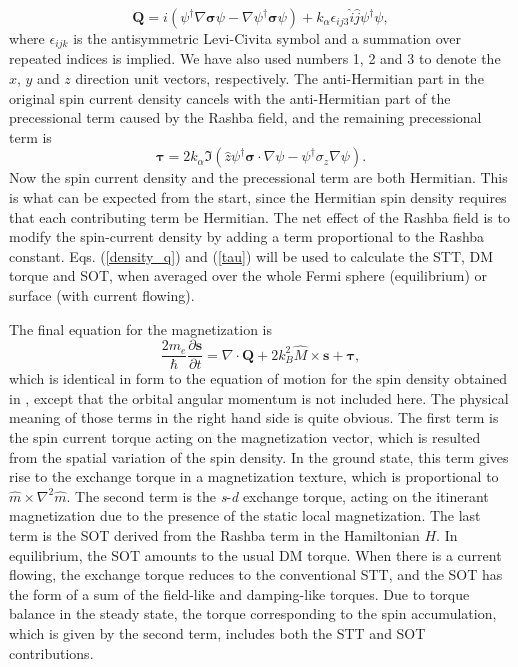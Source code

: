 \documentclass[12pt]{iopart}
\begin{document}
\begin{equation}
\textbf{Q} = i (\psi ^ \dagger \nabla \bm{\sigma} \psi - \nabla \psi ^ \dagger \bm{\sigma} \psi) + k_\alpha \epsilon _{ij3} \hat {i} \hat {j} \psi ^ \dagger \psi,
\label{density_q}
\end{equation}
where $\epsilon _{ijk}$ is the antisymmetric Levi-Civita symbol and a summation over repeated indices is implied. We have also used numbers 1, 2 and 3 to denote the $x$, $y$ and $z$ direction unit vectors, respectively. The anti-Hermitian part in the original spin current density cancels with the anti-Hermitian part of the precessional term caused by the Rashba field, and the remaining precessional term is
\begin{equation}
\bm {\tau} = 2k_\alpha \Im(\hat {z} \psi ^\dagger \bm {\sigma} \cdot \nabla \psi - \psi ^\dagger \sigma_z \nabla \psi).
\label{tau}
\end{equation}
Now the spin current density and the precessional term are both Hermitian. This is what can be expected from the start, since the Hermitian spin density requires that each contributing term be Hermitian. The net effect of the Rashba field is to modify the spin-current density by adding a term proportional to the Rashba constant. Eqs. (\ref{density_q}) and (\ref{tau}) will be used to calculate the STT, DM torque and SOT, when averaged over the whole Fermi sphere (equilibrium) or surface (with current flowing).

The final equation for the magnetization is
\begin{equation}
\frac{2 m_e} {\hbar} \frac {\partial \textbf {s}} {\partial t} = \nabla \cdot \textbf {Q} +  2k_B^2 \hat {M} \times \textbf {s} + \bm {\tau},
\end{equation}
which is identical in form to the equation of motion for the spin density obtained in \cite{Haney10}, except that the orbital angular momentum is not included here. The physical meaning of those terms in the right hand side is quite obvious. The first term is the spin current torque acting on the magnetization vector, which is resulted from the spatial variation of the spin density. In the ground state, this term gives rise to the exchange torque in a magnetization texture, which is proportional to $\hat{m} \times \nabla^2 \hat{m}$. The second term is the \textit{s}-\textit{d} exchange torque, acting on the itinerant magnetization due to the presence of the static local magnetization. The last term is the SOT derived from the Rashba term in the Hamiltonian $H$. In equilibrium, the SOT amounts to the usual DM torque. When there is a current flowing, the exchange torque reduces to the conventional STT, and the SOT has the form of a sum of the field-like and damping-like torques. Due to torque balance in the steady state, the torque corresponding to the spin accumulation, which is given by the second term, includes both the STT and SOT contributions.
\end{document}
